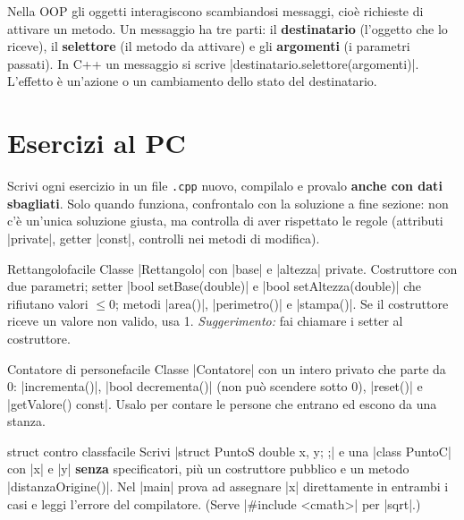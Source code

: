 \begin{orale}
Nella OOP gli oggetti interagiscono scambiandosi messaggi, cioè richieste di
attivare un metodo. Un messaggio ha tre parti: il \textbf{destinatario}
(l'oggetto che lo riceve), il \textbf{selettore} (il metodo da attivare) e gli
\textbf{argomenti} (i parametri passati). In C++ un messaggio si scrive
\cc|destinatario.selettore(argomenti)|. L'effetto è un'azione o un cambiamento
dello stato del destinatario.
\end{orale}

\section{Esercizi al PC}

Scrivi ogni esercizio in un file \texttt{.cpp} nuovo, compilalo e provalo
\textbf{anche con dati sbagliati}. Solo quando funziona, confrontalo con la
soluzione a fine sezione: non c'è un'unica soluzione giusta, ma controlla di
aver rispettato le regole (attributi \cc|private|, getter \cc|const|, controlli
nei metodi di modifica).

\begin{esercizio}{Rettangolo}{facile}
Classe \cc|Rettangolo| con \cc|base| e \cc|altezza| private. Costruttore con due
parametri; setter \cc|bool setBase(double)| e \cc|bool setAltezza(double)| che
rifiutano valori $\le 0$; metodi \cc|area()|, \cc|perimetro()| e \cc|stampa()|.
Se il costruttore riceve un valore non valido, usa 1.
\emph{Suggerimento:} fai chiamare i setter al costruttore.
\end{esercizio}

\begin{esercizio}{Contatore di persone}{facile}
Classe \cc|Contatore| con un intero privato che parte da 0: \cc|incrementa()|,
\cc|bool decrementa()| (non può scendere sotto 0), \cc|reset()| e
\cc|getValore() const|. Usalo per contare le persone che entrano ed escono da una stanza.
\end{esercizio}

\begin{esercizio}{struct contro class}{facile}
Scrivi \cc|struct PuntoS { double x, y; };| e una \cc|class PuntoC| con \cc|x| e
\cc|y| \textbf{senza} specificatori, più un costruttore pubblico e un metodo
\cc|distanzaOrigine()|. Nel \cc|main| prova ad assegnare \cc|x| direttamente in
entrambi i casi e leggi l'errore del compilatore. (Serve \cc|#include <cmath>|
per \cc|sqrt|.)
\end{esercizio}

